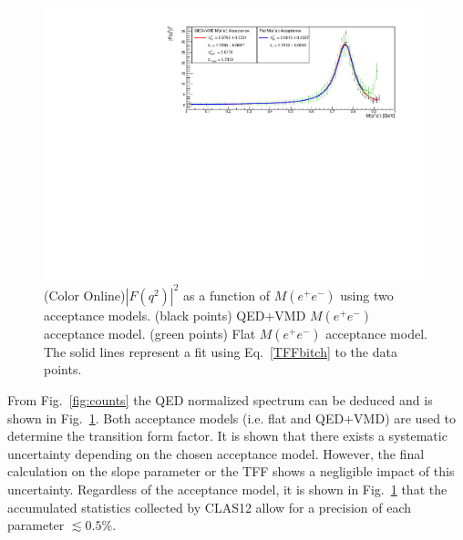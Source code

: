 \documentclass[11pt,a4paper,twocolumn]{article}
\newlength{\figwidth}
\newlength{\qfigheight}
\def\epem{e^+e^-}
\begin{document}
\begin{figure}[h!]\begin{center}
\includegraphics[width=\figwidth,height=1.3\qfigheight]{figures/result.pdf}
\caption[TFF as a function of $M(\epem)$]{\label{fig:results}{(Color Online)$\left|F(q^2)\right|^2$ as a function of $M(\epem)$ using two acceptance models. (black points) QED+VMD $M(\epem)$ acceptance model. (green points) Flat $M(\epem)$ acceptance model. The solid lines represent a fit using Eq.~\ref{TFFbitch} to the data points.}}
\end{center}\end{figure}
									
\FloatBarrier
From Fig.~\ref{fig:counts} the QED normalized spectrum can be deduced and is shown in Fig.~\ref{fig:results}. Both acceptance models (i.e. flat and QED+VMD) are used to determine the transition form factor. It is shown that there exists a systematic uncertainty depending on the chosen acceptance model. However, the final calculation on the slope parameter or the TFF shows a negligible impact of this uncertainty. Regardless of the acceptance model, it is shown in Fig.~\ref{fig:results} that the accumulated statistics collected by CLAS12 allow for a precision of each parameter $\lesssim 0.5\%$. 
\end{document}
